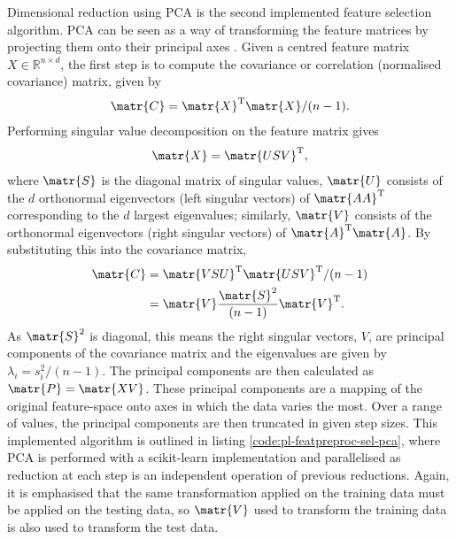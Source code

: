         
        Dimensional reduction using PCA is the second implemented feature selection algorithm. PCA can be seen as a way of transforming the feature matrices by projecting them onto their principal axes \cite{Klema1980}. Given a centred feature matrix $X\in\mathbb{R}^{n\times d}$, the first step is to compute the covariance or correlation (normalised covariance) matrix, given by
        \begin{align}
            \matr{C} = \matr{X}^\text{T}\matr{X}/(n-1).
        \end{align}
        Performing singular value decomposition on the feature matrix gives
        \begin{align}
            \matr{X} = \matr{USV}^\text{T},
        \end{align}
        where $\matr{S}$ is the diagonal matrix of singular values, $\matr{U}$ consists of the $d$ orthonormal eigenvectors (left singular vectors) of $\matr{AA}^\text{T}$ corresponding to the $d$ largest eigenvalues; similarly, $\matr{V}$ consists of the orthonormal eigenvectors (right singular vectors) of $\matr{A}^\text{T}\matr{A}$. By substituting this into the covariance matrix,
        \begin{align}
            \matr{C} &= \matr{VSU}^\text{T}\matr{USV}^\text{T}/(n-1)\\
              &= \matr{V}\frac{\matr{S}^2}{(n-1)}\matr{V}^\text{T}.
        \end{align}
        As $\matr{S}^2$ is diagonal, this means the right singular vectors, $V$, are principal components of the covariance matrix and the eigenvalues are given by $\lambda_i = s^2_i/(n-1)$. The principal components are then calculated as $\matr{P} = \matr{XV}$.
        These principal components are a mapping of the original feature-space onto axes in which the data varies the most. Over a range of values, the principal components are then truncated in given step sizes. This implemented algorithm is outlined in listing \ref{code:pl-featpreproc-sel-pca}, where PCA is performed with a scikit-learn implementation \cite{Pedregosa2012} and parallelised as reduction at each step is an independent operation of previous reductions. Again, it is emphasised that the same transformation applied on the training data must be applied on the testing data, so $\matr{V}$ used to transform the training data is also used to transform the test data.
        
